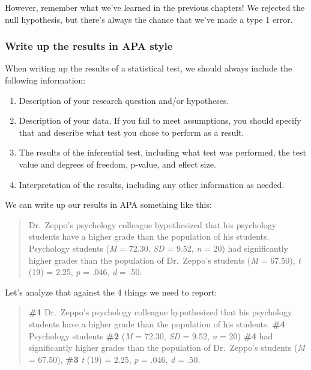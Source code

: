 \documentclass[
]{book}
\providecommand{\tightlist}{%
  \setlength{\itemsep}{0pt}\setlength{\parskip}{0pt}}
\begin{document}
However, remember what we've learned in the previous chapters! We rejected the null hypothesis, but there's always the chance that we've made a type 1 error.

\hypertarget{write-up-the-results-in-apa-style}{%
\subsubsection{Write up the results in APA style}\label{write-up-the-results-in-apa-style}}

When writing up the results of a statistical test, we should always include the following information:

\begin{enumerate}
\def\labelenumi{\arabic{enumi}.}
\tightlist
\item
  Description of your research question and/or hypotheses.
\item
  Description of your data. If you fail to meet assumptions, you should specify that and describe what test you chose to perform as a result.
\item
  The results of the inferential test, including what test was performed, the test value and degrees of freedom, p-value, and effect size.
\item
  Interpretation of the results, including any other information as needed.
\end{enumerate}

We can write up our results in APA something like this:

\begin{quote}
Dr.~Zeppo's psychology colleague hypothesized that his psychology students have a higher grade than the population of his students. Psychology students (\emph{M} = 72.30, \emph{SD} = 9.52, \emph{n} = 20) had significantly higher grades than the population of Dr.~Zeppo's students (\emph{M} = 67.50), \emph{t} (19) = 2.25, \emph{p} = .046, \emph{d} = .50.
\end{quote}

Let's analyze that against the 4 things we need to report:

\begin{quote}
\textbf{\#1} Dr.~Zeppo's psychology colleague hypothesized that his psychology students have a higher grade than the population of his students. \textbf{\#4} Psychology students \textbf{\#2} (\emph{M} = 72.30, \emph{SD} = 9.52, \emph{n} = 20) \textbf{\#4} had significantly higher grades than the population of Dr.~Zeppo's students (\emph{M} = 67.50), \textbf{\#3} \emph{t} (19) = 2.25, \emph{p} = .046, \emph{d} = .50.
\end{quote}
\end{document}
